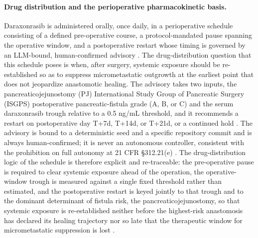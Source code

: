 
\paragraph{Drug distribution and the perioperative pharmacokinetic basis.}
Daraxonrasib is administered orally, once daily, in a perioperative schedule
consisting of a defined pre-operative course, a protocol-mandated pause spanning
the operative window, and a postoperative restart whose timing is governed by an
LLM-bound, human-confirmed advisory \cite{onpremwhippl}. The drug-distribution
question that this schedule poses is when, after surgery, systemic exposure
should be re-established so as to suppress micrometastatic outgrowth at the
earliest point that does not jeopardize anastomotic healing. The advisory takes
two inputs, the pancreaticojejunostomy (PJ) International Study Group of
Pancreatic Surgery (ISGPS) postoperative pancreatic-fistula grade (A, B, or C)
and the serum daraxonrasib trough relative to a 0.5 ng/mL threshold, and it
recommends a restart on postoperative day T+7d, T+14d, or T+21d, or a continued
hold \cite{onpremwhippl}. The advisory is bound to a deterministic seed and a
specific repository commit and is always human-confirmed; it is never an
autonomous controller, consistent with the prohibition on full autonomy at 21
CFR \S 312.21(e) \cite{cfr312paiuni}. The drug-distribution logic of the schedule
is therefore explicit and re-traceable: the pre-operative pause is required to
clear systemic exposure ahead of the operation, the operative-window trough is
measured against a single fixed threshold rather than estimated, and the
postoperative restart is keyed jointly to that trough and to the dominant
determinant of fistula risk, the pancreaticojejunostomy, so that systemic
exposure is re-established neither before the highest-risk anastomosis has
declared its healing trajectory nor so late that the therapeutic window for
micrometastatic suppression is lost \cite{onpremwhippl,qspmetpancre}.

